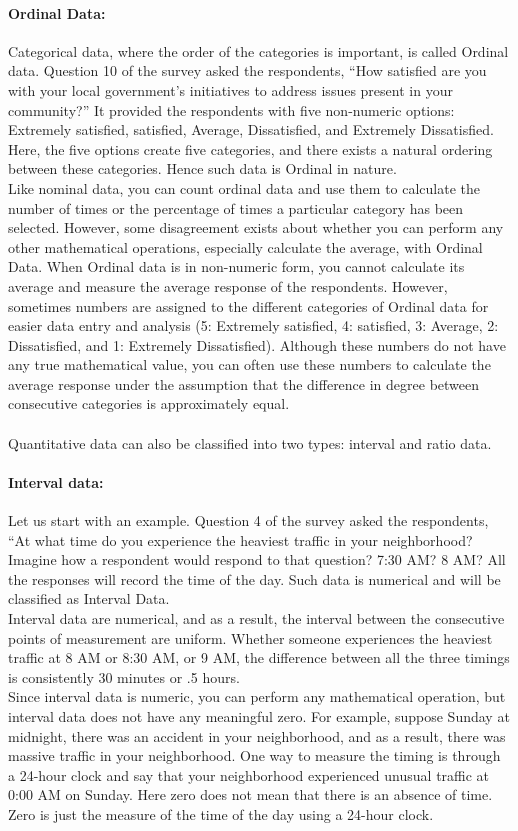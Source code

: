 \documentclass[a4paper, 11pt]{article}
\begin{document}
	\paragraph{Ordinal Data:} Categorical data, where the order of the categories is important, is called Ordinal data. Question 10 of the survey asked the respondents, “How satisfied are you with your local government’s initiatives to address issues present in your community?” It provided the respondents with five non-numeric options: Extremely satisfied, satisfied, Average, Dissatisfied, and Extremely Dissatisfied. Here, the five options create five categories, and there exists a natural ordering between these categories. Hence such data is Ordinal in nature.\\[1ex]
	Like nominal data, you can count ordinal data and use them to calculate the number of times or the percentage of times a particular category has been selected. However, some disagreement exists about whether you can perform any other mathematical operations, especially calculate the average, with Ordinal Data. When Ordinal data is in non-numeric form, you cannot calculate its average and measure the average response of the respondents. However, sometimes numbers are assigned to the different categories of Ordinal data for easier data entry and analysis (5: Extremely satisfied, 4: satisfied, 3: Average, 2: Dissatisfied, and 1: Extremely Dissatisfied). Although these numbers do not have any true mathematical value, you can often use these numbers to calculate the average response under the assumption that the difference in degree between consecutive categories is approximately equal.
%
	\paragraph{}Quantitative data can also be classified into two types: interval and ratio data.
%	
	\paragraph{Interval data:} Let us start with an example. Question 4 of the survey asked the respondents, “At what time do you experience the heaviest traffic in your neighborhood? Imagine how a respondent would respond to that question? 7:30 AM? 8 AM? All the responses will record the time of the day. Such data is numerical and will be classified as Interval Data.\\[1ex]
	Interval data are numerical, and as a result, the interval between the consecutive points of measurement are uniform. Whether someone experiences the heaviest traffic at 8 AM or 8:30 AM, or 9 AM, the difference between all the three timings is consistently 30 minutes or .5 hours.\\[1ex]
	Since interval data is numeric, you can perform any mathematical operation, but interval data does not have any meaningful zero. For example, suppose Sunday at midnight, there was an accident in your neighborhood, and as a result, there was massive traffic in your neighborhood. One way to measure the timing is through a 24-hour clock and say that your neighborhood experienced unusual traffic at 0:00 AM on Sunday. Here zero does not mean that there is an absence of time. Zero is just the measure of the time of the day using a 24-hour clock.
%
\end{document}
